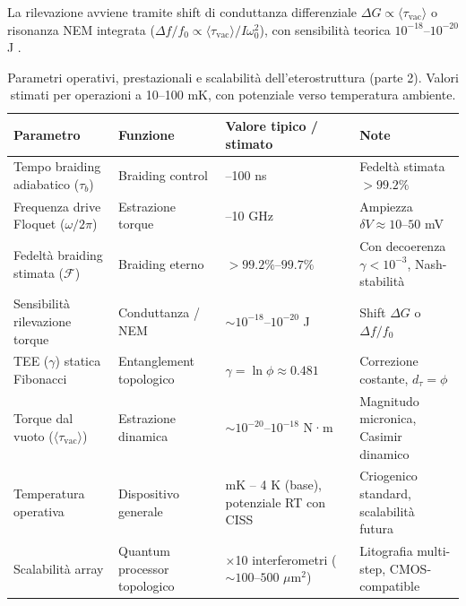 \documentclass[11pt,a4paper]{article}
\let\oldcite\cite
\renewcommand{\cite}{\protect\oldcite}
\theoremstyle{plain}
\theoremstyle{definition}
\begin{document}
La rilevazione avviene tramite shift di conduttanza differenziale $\Delta G \propto \langle \tau_{\text{vac}} \rangle$ o risonanza NEM integrata ($\Delta f / f_0 \propto \langle \tau_{\text{vac}} \rangle / I \omega_0^2$), con sensibilità teorica $10^{-18}$--$10^{-20}$ J \cite{regal2008measurement, castellanos-gomez2012nanomechanical}.







\begin{table}[H]
\centering
\small
\caption{Parametri operativi, prestazionali e scalabilità dell'eterostruttura (parte 2). Valori stimati per operazioni a 10--100 mK, con potenziale verso temperatura ambiente.}
\label{tab:device-parameters-perf}

\setlength{\tabcolsep}{5pt}
\begin{tabularx}{\textwidth}{@{} 
  >{\RaggedRight\arraybackslash}X 
  >{\RaggedRight\arraybackslash}l 
  >{\centering\arraybackslash}X 
  >{\RaggedRight\arraybackslash}X 
  @{}}

\toprule
\textbf{Parametro} & \textbf{Funzione} & \textbf{Valore tipico / stimato} & \textbf{Note} \\
\midrule
Tempo braiding adiabatico ($\tau_b$) & Braiding control & 10--100 ns & Fedeltà stimata $>99.2\%$ \\
Frequenza drive Floquet ($\omega/2\pi$) & Estrazione torque & 1--10 GHz & Ampiezza $\delta V \approx 10$--$50$ mV \\
Fedeltà braiding stimata ($\mathcal{F}$) & Braiding eterno & $>99.2\%$--$99.7\%$ & Con decoerenza $\gamma < 10^{-3}$, Nash-stabilità \\
Sensibilità rilevazione torque & Conduttanza / NEM & $\sim 10^{-18}$--$10^{-20}$ J & Shift $\Delta G$ o $\Delta f/f_0$ \\
TEE ($\gamma$) statica Fibonacci & Entanglement topologico & $\gamma = \ln \phi \approx 0.481$ & Correzione costante, $d_\tau = \phi$ \\
Torque dal vuoto ($\langle \tau_{\text{vac}} \rangle$) & Estrazione dinamica & $\sim 10^{-20}$--$10^{-18}$ N·m & Magnitudo micronica, Casimir dinamico \\
Temperatura operativa & Dispositivo generale & 10 mK – 4 K (base), potenziale RT con CISS & Criogenico standard, scalabilità futura \\
Scalabilità array & Quantum processor topologico & 10×10 interferometri ($\sim 100$--$500$ $\mu$m$^2$) & Litografia multi-step, CMOS-compatible \\
\bottomrule
\end{tabularx}
\end{table}
\end{document}
